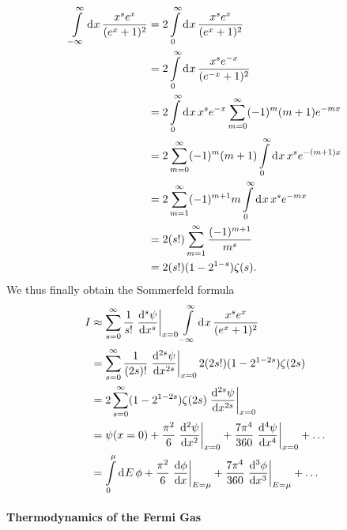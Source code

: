 \begin{align*}
	\int\limits_{-\infty}^{\infty}\dd[]{x}\frac{x^{s}e^{x}}{(e^{x} + 1)^{2}} &= 2\int\limits_{0}^{\infty}\dd[]{x}\frac{x^{s}e^{x}}{(e^{x} + 1)^{2}} \\
	                                                               &= 2\int\limits_{0}^{\infty}\dd[]{x}\frac{x^{s}e^{-x}}{(e^{-x} + 1)^{2}} \\
	                                                               &= 2\int\limits_{0}^{\infty}\dd[]{x}x^{s}e^{-x}\sum\limits_{m = 0}^{\infty}(-1)^{m}(m + 1)e^{-mx} \\
	                                                               &= 2\sum\limits_{m = 0}^{\infty}(-1)^{m}(m + 1)\int\limits_{0}^{\infty}\dd[]{x}x^{s}e^{-(m + 1)x} \\
	                                                               &= 2\sum\limits_{m = 1}^{\infty}(-1)^{m + 1}m\int\limits_{0}^{\infty}\dd[]{x}x^{s}e^{-mx} \\
	                                                               &= 2(s!)\sum\limits_{m = 1}^{\infty}\frac{(-1)^{m + 1}}{m^{s}} \\
	                                                               &= 2(s!)(1 - 2^{1 - s})\zeta(s).
\end{align*}
We thus finally obtain the Sommerfeld formula
\begin{align*}
	I &\approx \sum\limits_{s = 0}^{\infty}\frac{1}{s!}\eval{\dv[s]{\psi}{x}}_{x = 0}\integ{-\infty}{\infty}{x}{\frac{x^{s}e^{x}}{(e^{x} + 1)^{2}}} \\
	  &= \sum\limits_{s = 0}^{\infty}\frac{1}{(2s)!}\eval{\dv[2s]{\psi}{x}}_{x = 0}2(2s!)(1 - 2^{1 - 2s})\zeta(2s) \\
	  &= 2\sum\limits_{s = 0}^{\infty}(1 - 2^{1 - 2s})\zeta(2s)\eval{\dv[2s]{\psi}{x}}_{x = 0} \\
	  &= \psi(x = 0) + \frac{\pi^{2}}{6}\eval{\dv[2]{\psi}{x}}_{x = 0} + \frac{7\pi^{4}}{360}\eval{\dv[4]{\psi}{x}}_{x = 0} + \dots \\
	  &= \integ{0}{\mu}{E}{\phi} + \frac{\pi^{2}}{6}\eval{\dv{\phi}{x}}_{E = \mu} + \frac{7\pi^{4}}{360}\eval{\dv[3]{\phi}{x}}_{E = \mu} + \dots
\end{align*}

\paragraph{Thermodynamics of the Fermi Gas}

